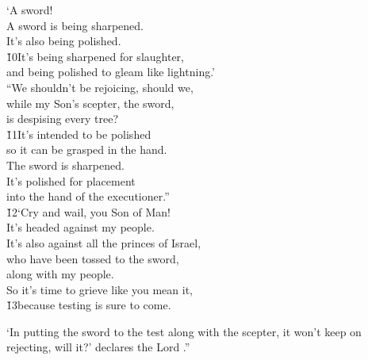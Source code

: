 \begin{poetry}
\poeml `A sword! \\
\poemll    A sword is being sharpened. \\
\poemlll       It's also being polished. \\
\poeml \v{10}It's being sharpened for slaughter, \\
\poemll    and being polished to gleam like lightning.' \\
\poeml ``We shouldn't be rejoicing, should we, \\
\poemll    while my Son's scepter, the sword, \\
\poemlll       is despising every tree? \\
\poeml \v{11}It's intended to be polished \\
\poemll    so it can be grasped in the hand. \\
\poeml The sword is sharpened. \\
\poemll    It's polished for placement \\
\poemlll       into the hand of the executioner.'' \\
\poeml \v{12}`Cry and wail, you Son of Man! \\
\poemll    It's headed against my people. \\
\poeml It's also against all the princes of Israel, \\
\poemll    who have been tossed to the sword, \\
\poemlll       along with my people. \\
\poeml So it's time to grieve like you mean it, \\
\poeml \v{13}because testing is sure to come.
\end{poetry}

`In putting the sword to the test along with the scepter, it won't keep on rejecting, will it?' declares the Lord .''

